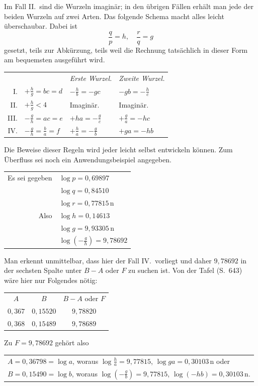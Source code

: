 Im Fall II.\ sind die Wurzeln imaginär; in den übrigen Fällen erhält man jede der beiden Wurzeln auf zwei Arten. Das folgende Schema macht alles leicht überschaubar. Dabei ist
\[
\frac{q}{p}=h,\quad \frac{r}{q}=g
\]
gesetzt, teils zur Abkürzung, teils weil die Rechnung tatsächlich in dieser Form am bequemsten ausgeführt wird.

\begin{center}
\begingroup\renewcommand{\arraystretch}{1.7}\begin{tabular}{rlll}
 & & \emph{Erste Wurzel.} & \emph{Zweite Wurzel.} \\
I. & $+\frac{h}{g}=bc=d$ & $-\frac{h}{b}=-gc$ & $-gb=-\frac{h}{c}$ \\
II. & $+\frac{h}{g}<4$ & Imaginär. & Imaginär. \\
III. & $-\frac{g}{h}=ac=e$ & $+ha=-\frac{g}{c}$ & $+\frac{g}{a}=-hc$ \\
IV. & $-\frac{g}{h}=\frac{b}{a}=f$ & $+\frac{h}{a}=-\frac{g}{b}$ & $+ga=-hb$
\end{tabular}\endgroup
\end{center}
\par
{}
Die Beweise dieser Regeln wird jeder leicht selbst entwickeln können. Zum Überfluss sei noch ein Anwendungsbeispiel angegeben.

\begin{center}
\begin{tabular}{rl}
Es sei gegeben & $\log p=0{,}69897$ \\
 & $\log q=0{,}84510$ \\
 & $\log r=0{,}77815\,\mathrm{n}$ \\
Also & $\log h=0{,}14613$ \\
 & $\log g=9{,}93305\,\mathrm{n}$ \\
 & $\log(-\frac{g}{h})=9{,}78692$
\end{tabular}
\end{center}

Man erkennt unmittelbar, dass hier der Fall IV.\ vorliegt und daher $9{,}78692$ in der sechsten Spalte unter $B-A$ oder $F$ zu suchen ist. Von der Tafel (S.\ 643) wäre hier nur Folgendes nötig:
\begin{center}
\begin{tabular}{c|c|c}
$A$ & $B$ & $B-A$ oder $F$ \\
$0{,}367$ & $0{,}15520$ & $9{,}78820$ \\
$0{,}368$ & $0{,}15489$ & $9{,}78689$
\end{tabular}
\end{center}
Zu $F=9{,}78692$ gehört also
\begin{center}
\begin{tabular}{l}
$A=0{,}36798=\log a$, woraus $\log\frac{h}{a}=9{,}77815$, $\log ga=0{,}30103\,\mathrm{n}$ oder \\
$B=0{,}15490=\log b$, woraus $\log(-\frac{g}{b})=9{,}77815$, $\log(-hb)=0{,}30103\,\mathrm{n}$.
\end{tabular}
\end{center}

